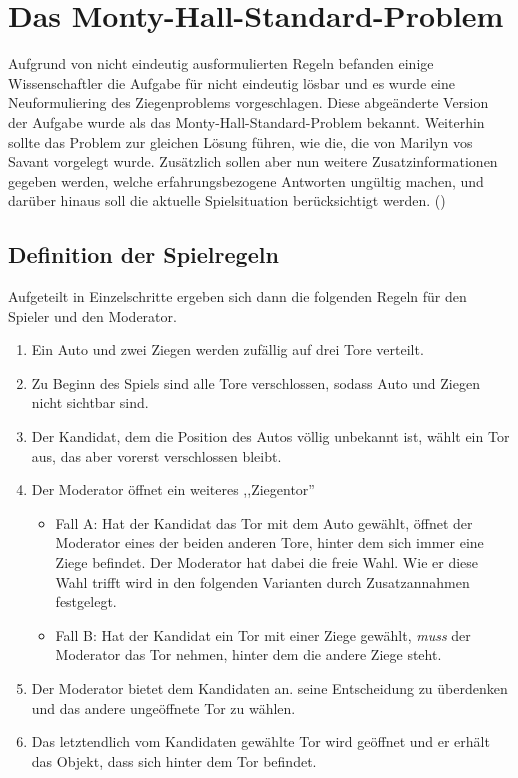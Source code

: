 
\chapter{Das Monty-Hall-Standard-Problem} \label{chap:monty-hall-standard}

Aufgrund von nicht eindeutig ausformulierten Regeln befanden einige Wissenschaftler die Aufgabe für nicht eindeutig lösbar und es wurde eine Neuformuliering des
Ziegenproblems vorgeschlagen. Diese abgeänderte Version der Aufgabe wurde als das Monty-Hall-Standard-Problem bekannt. Weiterhin sollte das Problem zur gleichen
Lösung führen, wie die, die von Marilyn vos Savant vorgelegt wurde. Zusätzlich sollen aber nun weitere Zusatzinformationen gegeben werden, welche erfahrungsbezogene Antworten ungültig
machen, und darüber hinaus soll die aktuelle Spielsituation berücksichtigt werden. (\cite{Mueser:1999})

\section{Definition der Spielregeln}

Aufgeteilt in Einzelschritte ergeben sich dann die folgenden Regeln für den Spieler und den Moderator.
\begin{enumerate}
    \item Ein Auto und zwei Ziegen werden zufällig auf drei Tore verteilt.
    \item Zu Beginn des Spiels sind alle Tore verschlossen, sodass Auto und Ziegen nicht sichtbar sind.
    \item Der Kandidat, dem die Position des Autos völlig unbekannt ist, wählt ein Tor aus, das aber vorerst verschlossen bleibt.
    \item Der Moderator öffnet ein weiteres ,,Ziegentor''\begin{itemize}
              \item Fall A: Hat der Kandidat das Tor mit dem Auto gewählt, öffnet der Moderator eines der beiden anderen Tore, hinter dem sich immer eine Ziege befindet.
                    Der Moderator hat dabei die freie Wahl. Wie er diese Wahl trifft wird in den folgenden Varianten durch Zusatzannahmen festgelegt.
              \item Fall B: Hat der Kandidat ein Tor mit einer Ziege gewählt, \textit{muss} der Moderator das Tor nehmen, hinter dem die andere Ziege steht.
          \end{itemize}
    \item Der Moderator bietet dem Kandidaten an. seine Entscheidung zu überdenken und das andere ungeöffnete Tor zu wählen.
    \item Das letztendlich vom Kandidaten gewählte Tor wird geöffnet und er erhält das Objekt, dass sich hinter dem Tor befindet.
\end{enumerate}

